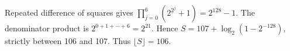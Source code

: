 Repeated difference of squares gives $\prod_{j=0}^6(2^{2^j}+1)=2^{128}-1$. The denominator product is $2^{0+1+\cdots+6}=2^{21}$. Hence $S=107+\log_2(1-2^{-128})$, strictly between 106 and 107. Thus $\boxed{\lfloor S\rfloor=106}$.
